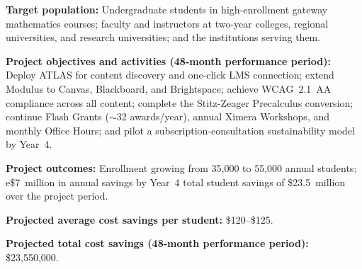 \documentclass[12pt,letterpaper]{article}
\begin{document}
\noindent\textbf{Target population:} Undergraduate students in
high-enrollment gateway mathematics courses; faculty and instructors at
two-year colleges, regional universities, and research universities;
and the institutions serving them.

\noindent\textbf{Project objectives and activities (48-month
performance period):} Deploy ATLAS for content discovery and one-click
LMS connection; extend Modulus to Canvas, Blackboard, and
Brightspace; achieve WCAG~2.1~AA compliance across all content;
complete the Stitz-Zeager Precalculus conversion; continue Flash
Grants ($\sim$32 awards/year), annual Ximera Workshops, and monthly
Office Hours; and pilot a subscription-consultation sustainability
model by Year~4.

\noindent\textbf{Project outcomes:} Enrollment growing from 35,000 to
55,000 annual students; e\$7~million in annual savings by Year~4
total student savings of \$23.5~million over the project period.

\noindent\textbf{Projected average cost savings per student:}
\$120--\$125.

\noindent\textbf{Projected total cost savings (48-month performance
period):} \$23,550,000.
\end{document}
